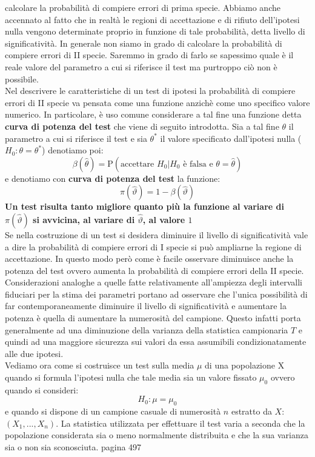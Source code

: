 \documentclass[a4paper,12pt, oneside]{book}
\begin{document}
calcolare la probabilità di compiere errori di prima specie.
Abbiamo anche accennato al fatto che in realtà le regioni di accettazione e di rifiuto
dell’ipotesi nulla vengono determinate proprio in funzione di tale probabilità, detta
livello di significatività.
In generale non siamo in grado di calcolare la probabilità di compiere errori di II
specie.
Saremmo in grado di farlo se sapessimo quale è il reale valore del parametro a cui si
riferisce il test ma purtroppo ciò non è possibile.\\
Nel descrivere le caratteristiche di un test di ipotesi la probabilità di
compiere errori di II specie va pensata come una funzione anzichè come uno specifico
valore numerico. In particolare, è uso comune considerare a tal fine una funzione detta \textbf{curva di potenza del test} che viene di seguito introdotta. Sia a tal fine $\theta$ il parametro a cui si riferisce il test e sia $\theta^*$ il valore specificato
dall’ipotesi nulla ($H_0 : \theta = \theta^*$) denotiamo poi:
\[\beta(\hat{\theta})=\mathrm{P}\left(\text {accettare } H_{0} | H_{0} \text { è falsa e } \theta=\hat{\theta}\right)\]
e denotiamo con \textbf{curva di potenza del test} la funzione:
\[\pi(\hat{\vartheta})=1-\beta(\hat{\vartheta})\]
\textbf{Un test risulta tanto migliore quanto più la funzione
al variare di $\pi(\hat{\vartheta})$ 
si avvicina, al variare di $\hat{\vartheta}$, al valore $1$}\\
Se nella costruzione di un test si desidera diminuire il livello di significatività vale a dire la probabilità di
compiere errori di I specie si può ampliarne la regione di accettazione.
In questo modo però come è facile osservare diminuisce anche la potenza del test ovvero aumenta la
probabilità di compiere errori della II specie.
Considerazioni analoghe a quelle fatte relativamente all’ampiezza degli intervalli fiduciari per la stima dei
parametri portano ad osservare che l’unica possibilità di far contemporaneamente diminuire il livello di
significatività e aumentare la potenza è quella di aumentare la numerosità del campione.
Questo infatti porta generalmente ad una diminuzione della varianza della statistica campionaria $T$ e
quindi ad una maggiore sicurezza sui valori da essa assumibili condizionatamente alle due ipotesi.\\
Vediamo ora come si costruisce un test sulla media $\mu$ di una popolazione X quando si
formula l’ipotesi nulla che tale media sia un valore fissato $\mu_0$ ovvero quando si
consideri:
\[H_0 : \mu=\mu_0\]
e quando si dispone di un campione casuale di numerosità $n$ estratto da $X$: $(X_1,...,X_n)$. La statistica utilizzata per effettuare il test varia a seconda che
la popolazione considerata sia o meno normalmente distribuita e che la sua varianza
sia o non sia sconosciuta.
pagina 497
\end{document}
